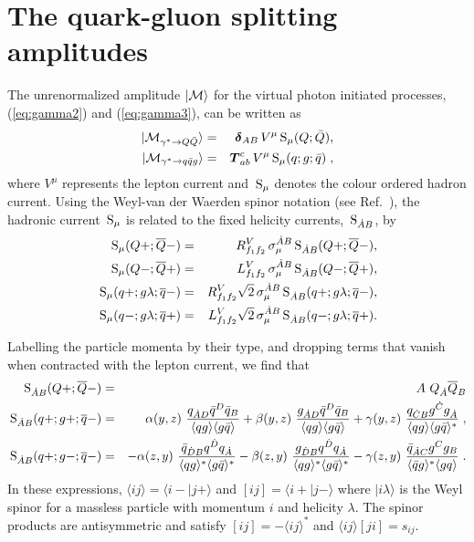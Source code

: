 \documentclass[paper,notoc,nohyper]{JHEP3}
\def\S{\, {\rm S}}
\def\bom#1{{\mbox{\boldmath $#1$}}}
\begin{document}
\section{The quark-gluon splitting amplitudes}
\label{sec:quarkgluon}

The unrenormalized 
amplitude $|{\cal M}\rangle$ for the virtual 
photon initiated processes, (\ref{eq:gamma2}) and 
(\ref{eq:gamma3}),
can be written as
\begin{eqnarray}
\label{eq:Mdef}
|{\cal M}_{\gamma^*\to Q\bar Q}\rangle &=& {\bom \delta_{AB}}\, V^\mu \S_\mu(Q;\bar Q),\nonumber \\
|{\cal M}_{\gamma^*\to q\bar q g}\rangle &=& {\bom T^c_{ab}}\,V^\mu \S_\mu(q;g;\bar q)\; ,
\end{eqnarray}
where $V^\mu$ represents the lepton current  and $\S_\mu$ denotes the colour
ordered hadron current.
Using the Weyl-van der Waerden spinor notation (see Ref.~\cite{Berends:w-vdw}), 
the hadronic current $\S_{\mu}$ is related to the fixed helicity 
currents, $\S_{{\dot A}B}$, by
\begin{eqnarray}
\label{eq:scurqq}
\S_{\mu}(Q+;\overline{Q}-) &=& R^V_{f_1f_2}
\, \sigma_{\mu}^{{\dot A}B} \S_{{\dot A}B}(Q+;\overline{Q}-) ,\\
\S_{\mu}(Q-;\overline{Q}+) &=& L^V_{f_1f_2}
\, \sigma_{\mu}^{{\dot A}B} \S_{{\dot A}B}(Q-;\overline{Q}+) ,\\
\label{eq:scurqqg}
\S_{\mu}(q+;g\lambda;\overline{q}-) &=& R^V_{f_1f_2}
 \sqrt2\, \sigma_{\mu}^{{\dot A}B} \S_{{\dot A}B}(q+;g\lambda;\overline{q}-) ,\\
 \S_{\mu}(q-;g\lambda;\overline{q}+) &=& L^V_{f_1f_2}
 \sqrt2\, \sigma_{\mu}^{{\dot A}B} \S_{{\dot A}B}(q-;g\lambda;\overline{q}+) .
\end{eqnarray}

Labelling the particle momenta by their type, and dropping terms that vanish
when contracted with the lepton current, we find that
\begin{eqnarray}
\label{eq:helampzqq}
{\S}_{\dot AB}(Q+;\overline{Q}-)&=& A~Q_{\dot A}\overline{Q}_{B} \\
\label{eq:helampzqqg1}
{\S}_{\dot AB}(q+;g+;\overline{q}-)
&=&
\alpha(y,z)~
\frac{q_{\dot AD}\bar{q}^D \bar{q}_{B}}{\langle qg \rangle\langle g\bar{q} \rangle}
+\beta(y,z)~
\frac{g_{\dot AD} \bar{q}^D \bar{q}_{B}}{\langle qg \rangle\langle g\bar{q} \rangle}
+\gamma(y,z)~
\frac{q_{\dot CB}g^{\dot C}g_{\dot A}}{\langle qg \rangle\langle g\bar{q} \rangle^*}  
\;,  \\
\label{eq:helampzqqg2}
{\S}_{\dot AB}(q+;g-;\overline{q}-)
&=&
-\alpha(z,y)~
\frac{\bar{q}_{\dot DB}q^{\dot D} q_{\dot A}}{\langle qg \rangle^*\langle g\bar{q} \rangle^*}
-\beta(z,y)~
\frac{g_{\dot DB} q^{\dot D} q_{\dot A}}{\langle qg \rangle^*\langle g\bar{q} \rangle^*}
-\gamma(z,y)~
\frac{\bar{q}_{\dot AC}g^{C}g_{B}}{\langle \bar{q}g \rangle^*\langle gq \rangle}  
\;.
\end{eqnarray}
In these expressions, $\langle ij\rangle = \langle i-| j+\rangle$ and 
$[ ij] = \langle i+| j-\rangle$ where $|i \lambda\rangle$ is the Weyl spinor for a massless particle with 
momentum $i$ and helicity $\lambda$.  The spinor products are antisymmetric and satisfy
$[ ij] = - \langle ij\rangle^*$ and $\langle ij\rangle[ji] = s_{ij}$.
\end{document}

